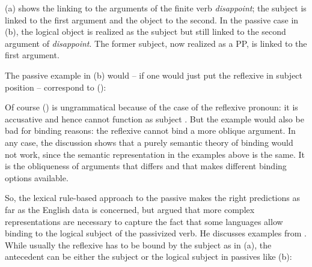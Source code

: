 \documentclass[output=paper,biblatex,babelshorthands,newtxmath,draftmode,colorlinks,citecolor=brown]{langscibook}
\begin{document}
{\jamwidth=5cm
\eal
{}
\zl
(a) shows the linking to the arguments of the finite verb \emph{disappoint}; the subject is
linked to the first argument and the object to the second. In the passive case in (b), the
logical object is realized as the subject but still linked to the second argument of
\emph{disappoint}. The former subject, now realized as a PP, is linked to the first argument. 

The passive example in (b) would -- if one would just put the reflexive in subject position
-- correspond to ():
\z
}

\noindent
Of course () is ungrammatical because of the case of the reflexive pronoun: it is accusative
and hence cannot function as subject \citep[]{Brame77}. But the example would also be bad for binding reasons: the
reflexive cannot bind a more oblique argument. In any case, the discussion shows that a purely
semantic theory of binding would not work, since the semantic representation in the examples above is
the same. It is the obliqueness of arguments that differs and that makes different binding options available.

So, the lexical rule-based approach to the passive makes the right predictions as far as the English
data is concerned, but \citet{Perlmutter1984} argued that more complex representations are necessary to capture the
fact that some languages allow binding to the logical subject of the passivized verb. He discusses
examples from . While usually the reflexive has to be bound by the subject as in
(a), the antecedent can be either the subject or the logical subject in passives like (b):
\end{document}
